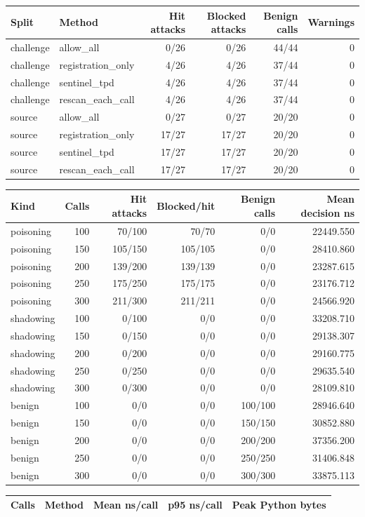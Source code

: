 \begin{tabular}{llrrrr}
Split & Method & Hit attacks & Blocked attacks & Benign calls & Warnings \\
\hline
challenge & allow\_all & 0/26 & 0/26 & 44/44 & 0 \\
challenge & registration\_only & 4/26 & 4/26 & 37/44 & 0 \\
challenge & sentinel\_tpd & 4/26 & 4/26 & 37/44 & 0 \\
challenge & rescan\_each\_call & 4/26 & 4/26 & 37/44 & 0 \\
source & allow\_all & 0/27 & 0/27 & 20/20 & 0 \\
source & registration\_only & 17/27 & 17/27 & 20/20 & 0 \\
source & sentinel\_tpd & 17/27 & 17/27 & 20/20 & 0 \\
source & rescan\_each\_call & 17/27 & 17/27 & 20/20 & 0 \\
\end{tabular}

\begin{tabular}{lrrrrr}
Kind & Calls & Hit attacks & Blocked/hit & Benign calls & Mean decision ns \\
\hline
poisoning & 100 & 70/100 & 70/70 & 0/0 & 22449.550 \\
poisoning & 150 & 105/150 & 105/105 & 0/0 & 28410.860 \\
poisoning & 200 & 139/200 & 139/139 & 0/0 & 23287.615 \\
poisoning & 250 & 175/250 & 175/175 & 0/0 & 23176.712 \\
poisoning & 300 & 211/300 & 211/211 & 0/0 & 24566.920 \\
shadowing & 100 & 0/100 & 0/0 & 0/0 & 33208.710 \\
shadowing & 150 & 0/150 & 0/0 & 0/0 & 29138.307 \\
shadowing & 200 & 0/200 & 0/0 & 0/0 & 29160.775 \\
shadowing & 250 & 0/250 & 0/0 & 0/0 & 29635.540 \\
shadowing & 300 & 0/300 & 0/0 & 0/0 & 28109.810 \\
benign & 100 & 0/0 & 0/0 & 100/100 & 28946.640 \\
benign & 150 & 0/0 & 0/0 & 150/150 & 30852.880 \\
benign & 200 & 0/0 & 0/0 & 200/200 & 37356.200 \\
benign & 250 & 0/0 & 0/0 & 250/250 & 31406.848 \\
benign & 300 & 0/0 & 0/0 & 300/300 & 33875.113 \\
\end{tabular}

\begin{tabular}{llrrr}
Calls & Method & Mean ns/call & p95 ns/call & Peak Python bytes \\
\hline
\end{tabular}
